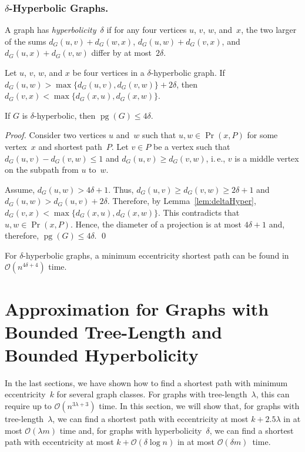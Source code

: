 \documentclass[10pt]{llncs}
\makeatletter
\newcommand{\calO}{\mathcal{O}}
\newcommand{\ie}{i.\,e.\@ifnextchar{,}{}{~}}
\DeclareMathOperator{\pg}{pg}
\makeatother
\begin{document}
\subsubsection{$\delta$-Hyperbolic Graphs.}

A graph has \emph{hyperbolicity}~$\delta$ if for any four vertices $u$, $v$, $w$, and~$x$, the  two  larger of the sums $d_G(u, v) + d_G(w, x)$, $d_G(u, w) + d_G(v, x)$, and $d_G(u, x) + d_G(v, w)$ differ by at most~$2\delta$.

\begin{lemma}
    \label{lem:deltaHyper}
Let $u$, $v$, $w$, and $x$ be four vertices in a $\delta$-hyperbolic graph.
If $d_G(u, w) > \max \{ d_G(u, v), d_G(v, w) \} + 2\delta$, then $d_G(v, x) < \max \{ d_G(x, u), d_G(x, w) \}$.
\end{lemma}

\begin{lemma}
If $G$ is $\delta$-hyperbolic, then $\pg(G) \leq 4 \delta$.
\end{lemma}

\begin{proof}
Consider two vertices $u$ and~$w$ such that $u,w \in \Pr(x, P)$ for some vertex~$x$ and shortest path~$P$.
Let $v \in P$ be a vertex such that $d_G(u, v) - d_G(v, w) \leq 1$ and $d_G(u, v) \geq d_G(v, w)$, \ie, $v$ is a middle vertex on the subpath from $u$ to~$w$.

Assume, $d_G(u, w) > 4\delta + 1$.
Thus, $d_G(u, v) \geq d_G(v, w) \geq 2\delta + 1$ and $d_G(u, w) > d_G(u, v) + 2\delta$.
Therefore, by Lemma~\ref{lem:deltaHyper}, $d_G(v, x) < \max \{ d_G(x, u), d_G(x, w) \}$.
This contradicts that $u,w \in \Pr(x, P)$.
Hence, the diameter of a projection is at most $4 \delta + 1$ and, therefore, $\pg(G) \leq 4 \delta$.
\qed
\end{proof}

\begin{corollary}
For $\delta$-hyperbolic graphs, a minimum eccentricity shortest path can be found in $\calO(n^{4\delta+4})$ time.
\end{corollary}

\section{Approximation for Graphs with Bounded Tree-Length and Bounded Hyperbolicity}

In the last sections, we have shown how to find a shortest path with minimum eccentricity~$k$ for several graph classes.
For graphs with tree-length~$\lambda$, this can require up to $\calO(n^{3\lambda + 3})$ time.
In this section, we will show that, for graphs with tree-length~$\lambda$, we can find a shortest path with eccentricity at most $k + 2.5\lambda$ in at most $\calO(\lambda m)$ time and, for graphs with hyperbolicity~$\delta$, we can find a shortest path with eccentricity at most $k + \calO(\delta \log n)$ in at most $\calO(\delta m)$~time.
\end{document}
